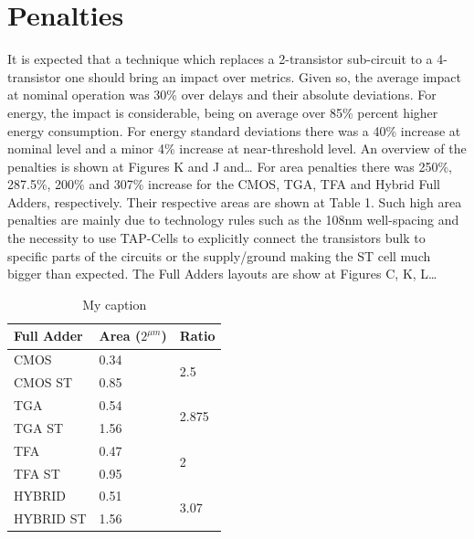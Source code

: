 \documentclass[ecp,tc, english]{iiufrgs}
\begin{document}
\section{Penalties}
It is expected that a technique which replaces a 2-transistor sub-circuit to a 4-transistor one should bring an impact over metrics. Given so, the average impact at nominal operation was 30\% over delays and their absolute deviations. For energy, the impact is considerable, being on average over 85\% percent higher energy consumption. For energy standard deviations there was a 40\% increase at nominal level and a minor 4\% increase at near-threshold level. An overview of the penalties is shown at Figures K and J and…
For area penalties there was 250\%, 287.5\%, 200\% and 307\% increase for the CMOS, TGA, TFA and Hybrid Full Adders, respectively. Their respective areas are shown at Table 1. Such high area penalties are mainly due to technology rules such as the 108nm well-spacing and the necessity to use TAP-Cells to explicitly connect the transistors bulk to specific parts of the circuits or the supply/ground making the ST cell much bigger than expected. The Full Adders layouts are show at Figures C, K, L…

\begin{table}[H]
\centering
\caption{My caption}
\label{my-label}
\begin{tabular}{|l|l|l|}
\hline
\textbf{Full Adder} & \textbf{Area ($2^{\mu m}$)} & \textbf{Ratio} \\ \hline
CMOS & 0.34 & \multirow{2}{*}{2.5} \\ \cline{1-2}
CMOS ST & 0.85 &  \\ \hline
TGA & 0.54 & \multirow{2}{*}{2.875} \\ \cline{1-2}
TGA ST & 1.56 &  \\ \hline
TFA & 0.47 & \multirow{2}{*}{2} \\ \cline{1-2}
TFA ST & 0.95 &  \\ \hline
HYBRID & 0.51 & \multirow{2}{*}{3.07} \\ \cline{1-2}
HYBRID ST & 1.56 &  \\ \hline
\end{tabular}
\end{table}
\end{document}
